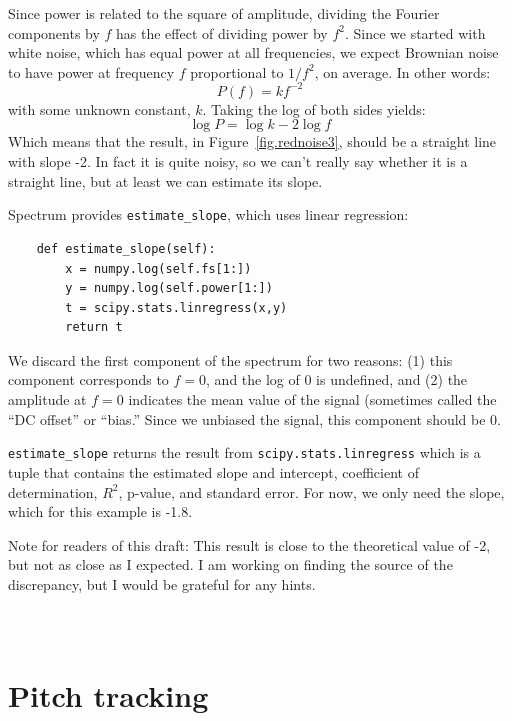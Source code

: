 \documentclass[12pt]{book}
\begin{document}
Since power is related to the square of amplitude, dividing the
Fourier components by $f$ has the effect of dividing power by $f^2$.
Since we started with white noise, which has equal power at all
frequencies, we expect Brownian noise to have power at frequency $f$
proportional to $1/f^2$, on average.  In other words:
%
\[ P(f) = k f^{-2} \]
%
with some unknown constant, $k$.  Taking the log of both sides yields:
%
\[ \log P = \log k -2 \log f \]
%
Which means that the result, in Figure~\ref{fig.rednoise3}, should be
a straight line with slope -2.  In fact it is quite noisy, so we can't
really say whether it is a straight line, but at least we can estimate
its slope.

Spectrum provides \verb"estimate_slope", which uses linear
regression:

\begin{verbatim}
    def estimate_slope(self):
        x = numpy.log(self.fs[1:])
        y = numpy.log(self.power[1:])
        t = scipy.stats.linregress(x,y)
        return t
\end{verbatim}

We discard the first component of the spectrum for two reasons:
(1) this component corresponds to
$f=0$, and the log of 0 is undefined, and (2) the amplitude at
$f=0$ indicates the mean value of the signal (sometimes called the
``DC offset'' or ``bias.''  Since we unbiased the signal, this
component should be 0.

\verb"estimate_slope" returns the
result from {\tt scipy.stats.linregress} which is a tuple that
contains the estimated slope and intercept, coefficient of
determination, $R^2$, p-value, and standard error.  For now,
we only need the slope, which for this example is -1.8.

Note for readers of this draft: This result is close to the
theoretical value of -2, but not as close as I expected.  I am
working on finding the source of the discrepancy, but I would be
grateful for any hints.


\begin{verbatim}
\end{verbatim}

\begin{verbatim}
\end{verbatim}

\begin{verbatim}
\end{verbatim}


\chapter{Pitch tracking}
\end{document}
